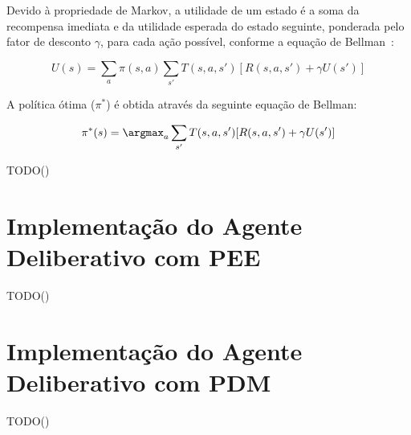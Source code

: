 Devido à propriedade de Markov, a utilidade de um estado é a soma da recompensa imediata e da utilidade esperada do estado seguinte, ponderada pelo fator de desconto $\gamma$, para cada ação possível, conforme a equação de Bellman~\cite{isel:iasa:slides:processos-decisao-sequencial}:

\begin{equation}
    U(s) = \sum_{a} \pi(s, a) \sum_{s'} T(s, a, s') [R(s, a, s') + \gamma U(s')]
\end{equation}

A política ótima ($\pi^*$) é obtida através da seguinte equação de Bellman:

\begin{equation}
    \pi^*(s) = \argmax_{a} \sum_{s'} T(s, a, s') [R(s, a, s') + \gamma U(s')]
\end{equation}

TODO()


\section{Implementação do Agente Deliberativo com PEE}\label{sec:implementacao-agente-deliberativo-com-pee}
TODO()


\section{Implementação do Agente Deliberativo com PDM}\label{sec:implementacao-agente-deliberativo-com-pdm}
TODO()

